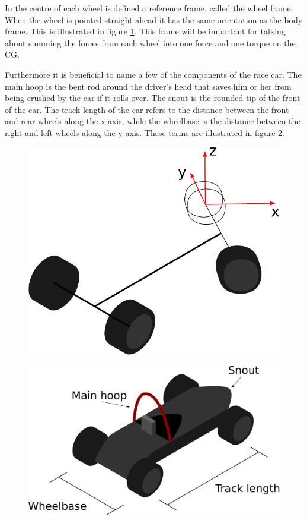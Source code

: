 In the centre of each wheel is defined a reference frame, called the wheel frame. When the wheel is pointed straight ahead it has the same orientation as the body frame. This is illustrated in figure \ref{Fig:WheelFrame}. This frame will be important for talking about summing the forces from each wheel into one force and one torque on the CG. 

Furthermore it is beneficial to name a few of the components of the race car. The main hoop is the bent rod around the driver's head that saves him or her from being crushed by the car if it rolls over. The snout is the rounded tip of the front of the car. The track length of the car refers to the distance between the front and rear wheels along the x-axis, while the wheelbase is the distance between the right and left wheels along the y-axis. These terms are illustrated in figure \ref{Fig:NameOfCarParts}.

\begin{figure}
    \centering
    \includegraphics[width=0.5\linewidth]{0_Images/2_Introduction/WheelFrame.pdf}
    \label{Fig:WheelFrame}
\end{figure}


\begin{figure}
    \centering
    \includegraphics[width=0.5\linewidth]{0_Images/2_Introduction/NameOfCarParts.pdf}
    \label{Fig:NameOfCarParts}
\end{figure}

